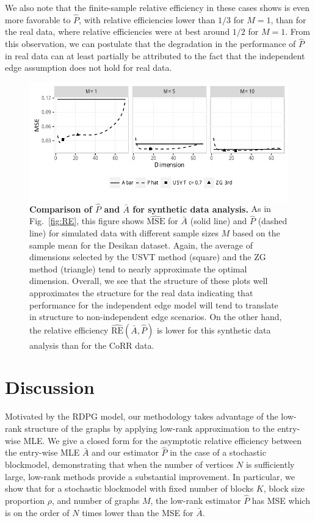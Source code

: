 \documentclass[10pt,letterpaper]{article}
\renewcommand{\hat}{\widehat}
\begin{document}
We also note that the finite-sample relative efficiency in these cases shows is even more favorable to $\hat{P}$, with relative efficiencies lower than $1/3$ for $M=1$, than for the real data, where relative efficiencies were at best around $1/2$ for $M=1$.
From this observation, we can postulate that the degradation in the performance of $\hat{P}$ in real data can at least partially be attributed to the fact that the independent edge assumption does not hold for real data.


\begin{figure}[!htbp]
\centering
\includegraphics[width=1\textwidth]{sim_desikan.pdf}
\caption{{\bf Comparison of $\hat{P}$ and $\bar{A}$ for synthetic data analysis.}
As in Fig.~\ref{fig:RE}, this figure shows $\hat{\mathrm{MSE}}$ for $\bar{A}$ (solid line) and $\hat{P}$ (dashed line) for simulated data with different sample sizes $M$ based on the sample mean for the Desikan dataset. Again, the average of dimensions selected by the USVT method (square) and the ZG method (triangle) tend to nearly approximate the optimal dimension. 
Overall, we see that the structure of these plots well approximates the structure for the real data indicating that performance for the independent edge model will tend to translate in structure to non-independent edge scenarios. 
On the other hand, the relative efficiency $\hat{\mathrm{RE}}(\bar{A},\hat{P})$ is lower for this synthetic data analysis than for the CoRR data.}
\label{fig:sim_desikan}
\end{figure}



\section{Discussion}\label{sec:discussion}

Motivated by the RDPG model, our methodology takes advantage of the low-rank structure of the graphs by applying low-rank approximation to the entry-wise MLE. 
We give a closed form for the asymptotic relative efficiency between the entry-wise MLE $\bar{A}$ and our estimator $\hat{P}$ in the case of a stochastic blockmodel, demonstrating that when the number of vertices $N$ is sufficiently large, low-rank methods provide a substantial improvement.
In particular, we show that for a stochastic blockmodel with fixed number of blocks $K$, block size proportion $\rho$, and number of graphs $M$, the low-rank estimator $\hat{P}$ has MSE which is on the order of $N$ times lower than the MSE for $\bar{A}$.
\end{document}
